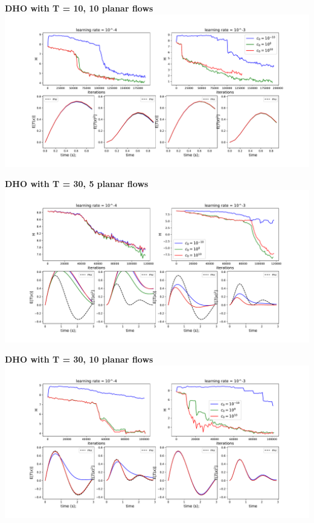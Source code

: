 \documentclass[11pt]{article}
\begin{document}
\begin{center}
\textbf{DHO with T = 10, 10 planar flows}
\includegraphics[scale=.41]{images/DHO_10P_T=10.pdf} \\
\end{center}
\clearpage

\begin{center}
\textbf{DHO with T = 30, 5 planar flows}
\includegraphics[scale=.41]{images/DHO_5P_T=30.pdf} \\
\end{center}

\begin{center}
\textbf{DHO with T = 30, 10 planar flows}
\includegraphics[scale=.41]{images/DHO_10P_T=30.pdf} \\
\end{center}
\clearpage
\end{document}
